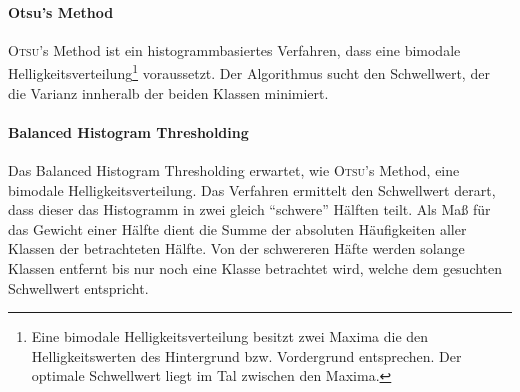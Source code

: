 
\paragraph{Otsu's Method}
\textsc{Otsu}'s Method ist ein histogrammbasiertes Verfahren, dass eine bimodale Helligkeitsverteilung\footnote{Eine bimodale Helligkeitsverteilung besitzt zwei Maxima die den Helligkeitswerten des Hintergrund bzw. Vordergrund entsprechen. Der optimale Schwellwert liegt im Tal zwischen den Maxima.} voraussetzt.
Der Algorithmus sucht den Schwellwert, der die Varianz innheralb der beiden Klassen minimiert.

\paragraph{Balanced Histogram Thresholding}
Das Balanced Histogram Thresholding erwartet, wie \textsc{Otsu}'s Method, eine bimodale Helligkeitsverteilung.
Das Verfahren ermittelt den Schwellwert derart, dass dieser das Histogramm in zwei gleich "`schwere"' Hälften teilt.
Als Maß für das Gewicht einer Hälfte dient die Summe der absoluten Häufigkeiten aller Klassen der betrachteten Hälfte.
Von der schwereren Häfte werden solange Klassen entfernt bis nur noch eine Klasse betrachtet wird, welche dem gesuchten Schwellwert entspricht.
